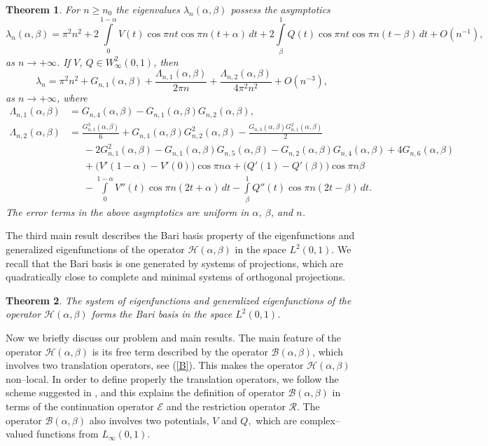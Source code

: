 \documentclass[10pt, a4paper]{article}
\theoremstyle{plain}
\newtheorem{theorem}{Theorem}
\theoremstyle{definition}
\numberwithin{equation}{section}
\def\a{\alpha}
\def\b{\beta}
\def\Op{\mathcal{H}}
\def\cR{\mathcal{R}}
\def\cE{\mathcal{E}}
\def\cB{\mathcal{B}}
\begin{document}
\begin{theorem}\label{th2}
For $n\geqslant n_0$ the eigenvalues $\lambda_n(\a,\b)$  possess
the asymptotics
\begin{equation}\label{mainasymptinfty}
\lambda_n(\a,\b)= \pi^2n^2+2\int\limits_0^{1-\alpha}V(t)\cos \pi nt\cos \pi n(t+\alpha)\,dt
+2\int\limits_\beta^1Q(t)\cos \pi nt\cos \pi n(t-\beta)\,dt+O(n^{-1}),
\end{equation}
as $n\to +\infty$. If $V$, $Q\in W^2_\infty (0, 1)$, then
\begin{equation}\label{lambdan1sm}
\lambda_n = \pi^2n^2+G_{n, 1}(\alpha, \beta)+\frac{\Lambda_{n, 1}(\alpha, \beta)}{2\pi n}
+\frac{\Lambda_{n, 2}(\alpha, \beta)}{4\pi^2n^2}+O(n^{-3}),
\end{equation}
as $n\to +\infty$, where
\begin{align*}
\Lambda_{n, 1}(\alpha, \beta) &= G_{n, 4}(\alpha, \beta)-G_{n, 1}(\alpha, \beta)G_{n, 2}(\alpha, \beta), \\
\Lambda_{n, 2}(\alpha, \beta) &= \frac{G_{n, 1}^3(\alpha, \beta)}{6}+G_{n, 1}(\alpha, \beta)G_{n, 2}^2(\alpha, \beta)
-\frac{G_{n, 3}(\alpha, \beta)G_{n, 1}^2(\alpha, \beta)}{2} \\
&\phantom{123}-2G_{n, 1}^2(\alpha, \beta)-G_{n, 1}(\alpha, \beta)G_{n, 5}(\alpha, \beta)
-G_{n, 2}(\alpha, \beta)G_{n, 4}(\alpha, \beta)+4G_{n, 6}(\alpha, \beta) \\
&\phantom{123}+\big(V'(1-\alpha)-V'(0)\big)\cos\pi n\alpha+\big(Q'(1)-Q'(\beta)\big)\cos\pi n\beta \\
&\phantom{123}-\int\limits_0^{1-\alpha}V''(t)\cos\pi n(2t+\alpha)\,dt-\int\limits_\beta^{1}Q''(t)\cos\pi n(2t-\beta)\,dt.
\end{align*}
The error terms in the above asymptotics are  uniform in $\alpha$, $\beta$, and $n$.
\end{theorem}

The third main result describes the Bari basis property of the eigenfunctions and generalized eigenfunctions of the
operator $\mathcal{H}(\alpha, \beta)$ in the space  $L^2(0, 1)$. We recall that the Bari basis is one generated by
systems of projections, which are quadratically close to complete and minimal systems of orthogonal projections.
\begin{theorem}\label{th3}
The system of eigenfunctions and generalized eigenfunctions of the operator
$\mathcal{H}(\alpha, \beta)$ forms the Bari basis in the space $L^2(0, 1)$.
\end{theorem}

Now we briefly discuss  our problem and main results. The main feature of the operator $\Op(\a,\b)$ is its free term described by the operator $\cB(\a,\b)$, which involves two translation operators, see (\ref{B}). This makes the operator $\Op(\a,\b)$ non--local. In order to define properly the translation operators, we follow the scheme suggested in \cite{Skub_Book}, \cite{SkubUMN} and this explains the definition of operator $\cB(\a,\b)$ in terms of the continuation operator $\cE$ and the restriction operator $\cR.$ The operator $\cB(\a,\b)$ also involves two potentials, $V$ and $Q,$ which are complex--valued functions from $L_\infty(0,1).$
\end{document}

